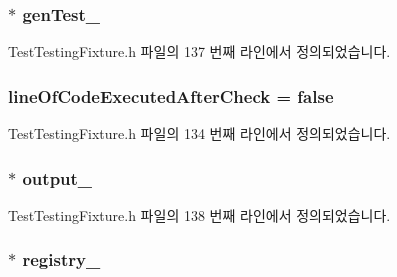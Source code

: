 \subsubsection[{\texorpdfstring{gen\+Test\+\_\+}{genTest_}}]{$\ast$ gen\+Test\+\_\+}\hypertarget{class_test_testing_fixture_a4fb8d35501f68baa40fd56474d3f246b}{}\label{class_test_testing_fixture_a4fb8d35501f68baa40fd56474d3f246b}


Test\+Testing\+Fixture.\+h 파일의 137 번째 라인에서 정의되었습니다.

\subsubsection[{\texorpdfstring{line\+Of\+Code\+Executed\+After\+Check}{lineOfCodeExecutedAfterCheck}}]{ line\+Of\+Code\+Executed\+After\+Check = {\bf false}\hspace{0.3cm}{\ttfamily [static]}}\hypertarget{class_test_testing_fixture_adbc177067f58e8ba7023e1cdcd830357}{}\label{class_test_testing_fixture_adbc177067f58e8ba7023e1cdcd830357}


Test\+Testing\+Fixture.\+h 파일의 134 번째 라인에서 정의되었습니다.

\subsubsection[{\texorpdfstring{output\+\_\+}{output_}}]{$\ast$ output\+\_\+}\hypertarget{class_test_testing_fixture_a1a9a780805871c30a09c52fe437374fe}{}\label{class_test_testing_fixture_a1a9a780805871c30a09c52fe437374fe}


Test\+Testing\+Fixture.\+h 파일의 138 번째 라인에서 정의되었습니다.

\subsubsection[{\texorpdfstring{registry\+\_\+}{registry_}}]{$\ast$ registry\+\_\+}\hypertarget{class_test_testing_fixture_a06daa3d9c1f367883447738388bd760d}{}\label{class_test_testing_fixture_a06daa3d9c1f367883447738388bd760d}


